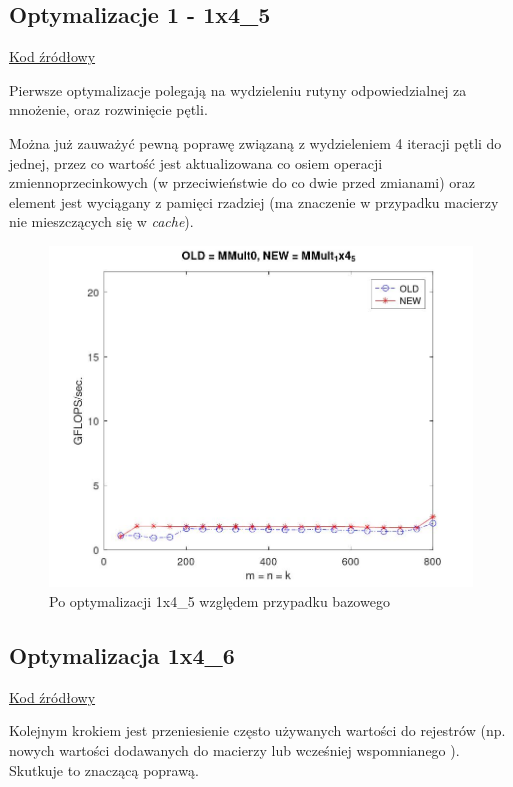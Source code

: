 \documentclass{article}
\begin{document}
\subsection{Optymalizacje 1 - 1x4\_5}

\href{https://github.com/flame/how-to-optimize-gemm/blob/master/src/MMult_1x4_5.c}{Kod źródłowy}

\noindent Pierwsze optymalizacje polegają na wydzieleniu rutyny odpowiedzialnej za mnożenie,
oraz rozwinięcie pętli. 

Można już zauważyć pewną poprawę związaną z wydzieleniem 4 iteracji
pętli do jednej, przez co wartość  jest aktualizowana co osiem operacji zmiennoprzecinkowych
(w przeciwieństwie do co dwie przed zmianami) oraz element  jest wyciągany z pamięci
rzadziej (ma znaczenie w przypadku macierzy nie mieszczących się w \textit{cache}).

\begin{figure}[H]
    \centering
    \includegraphics[width=1.0\textwidth]{figure2.jpg}
    \caption{Po optymalizacji 1x4\_5 względem przypadku bazowego}
\end{figure}

\subsection{Optymalizacja 1x4\_6}

\href{https://github.com/flame/how-to-optimize-gemm/blob/master/src/MMult_1x4_6.c}{Kod źródłowy}


\noindent Kolejnym krokiem jest przeniesienie często używanych wartości do rejestrów (np. nowych
wartości dodawanych do macierzy  lub wcześniej wspomnianego ).
Skutkuje to znaczącą poprawą.
\end{document}

